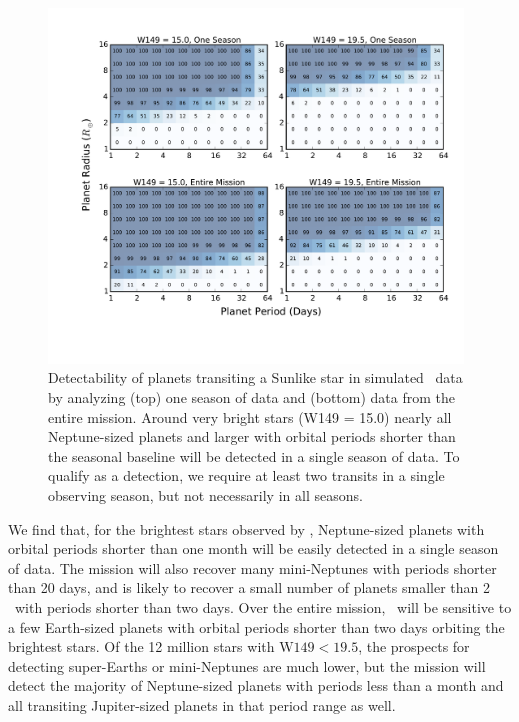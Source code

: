\begin{figure}[htbp!]
\centerline{\includegraphics[width=0.98\textwidth]{chapter8/f4.pdf}}
\caption[Fraction of planets of given sizes and orbital periods expected to be detected by \WF.]{Detectability of planets transiting a Sunlike star in simulated \WF\ data by analyzing (top) one season of data and (bottom) data from the entire mission.
Around very bright stars (W149 = 15.0) nearly all Neptune-sized planets and larger with
orbital periods shorter than the seasonal baseline will
be detected in a single season of data.
To qualify as a detection, we require at least two transits in a single observing season,
but not necessarily in all seasons.
}
\label{fig:Sensitivity}
\end{figure}

We find that, for the brightest stars observed by \WF, Neptune-sized planets with
orbital periods shorter than one month will be easily detected in a single season of data. 
The mission will also recover many mini-Neptunes with periods shorter than 20 days, and
is likely to recover a small number of planets smaller than 2 \rearth\ with 
periods shorter than two days. 
Over the entire mission, \WF\ will be sensitive to a few Earth-sized planets 
with orbital periods shorter than two days orbiting the brightest stars.
Of the 12 million stars with $\textrm{W149} < 19.5$, the prospects for detecting super-Earths
or mini-Neptunes are much lower, but the mission will detect the majority of  
Neptune-sized planets with periods less than a month and all transiting Jupiter-sized
planets in that period range as well.

